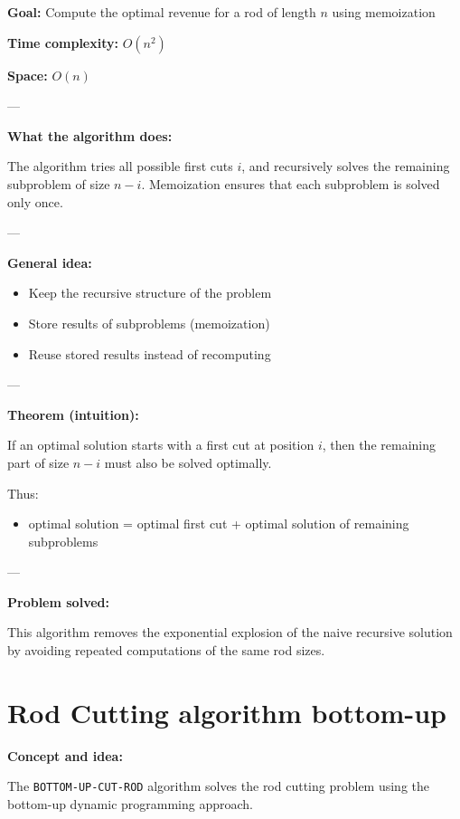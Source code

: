 \documentclass[11pt,a4paper,openany]{book}
\begin{document}
\textbf{Goal:} Compute the optimal revenue for a rod of length $n$ using memoization

\textbf{Time complexity:} $O(n^2)$

\textbf{Space:} $O(n)$

---

\textbf{What the algorithm does:}

The algorithm tries all possible first cuts $i$, and recursively solves the remaining subproblem of size $n-i$.  
Memoization ensures that each subproblem is solved only once.

---

\textbf{General idea:}
\begin{itemize}
    \item Keep the recursive structure of the problem
    \item Store results of subproblems (memoization)
    \item Reuse stored results instead of recomputing
\end{itemize}

---

\textbf{Theorem (intuition):}

If an optimal solution starts with a first cut at position $i$, then the remaining part of size $n-i$ must also be solved optimally.

Thus:
\begin{itemize}
    \item optimal solution = optimal first cut + optimal solution of remaining subproblems
\end{itemize}

---

\textbf{Problem solved:}

This algorithm removes the exponential explosion of the naive recursive solution by avoiding repeated computations of the same rod sizes.








\vspace{2cm}




\section{Rod Cutting algorithm bottom-up}

\textbf{Concept and idea:}

The \texttt{BOTTOM-UP-CUT-ROD} algorithm solves the rod cutting problem using the bottom-up dynamic programming approach.
\end{document}
